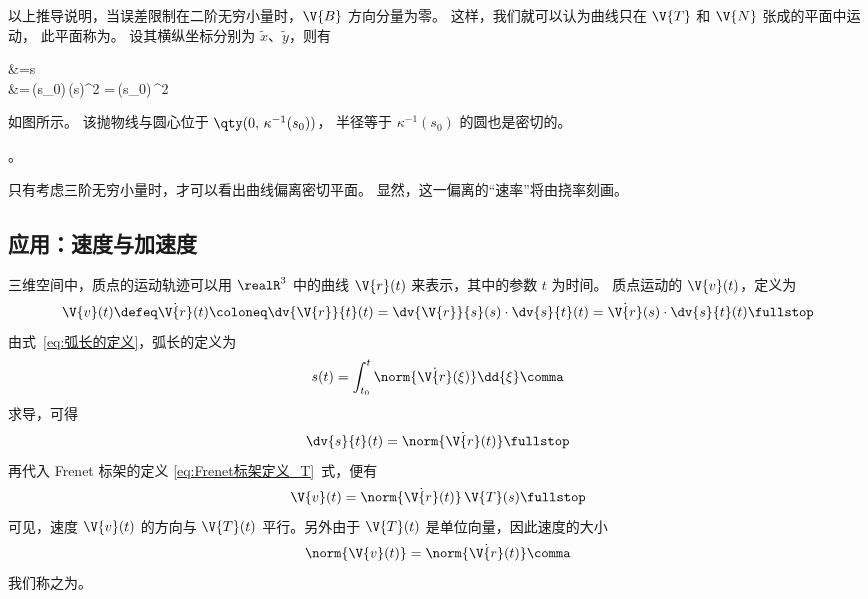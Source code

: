 以上推导说明，当误差限制在二阶无穷小量时，$\V{B}$ 方向分量为零。
这样，我们就可以认为曲线只在 $\V{T}$ 和 $\V{N}$ 张成的平面中运动，
此平面称为。
设其横纵坐标分别为 $\tilde{x}$、$\tilde{y}$，则有
\begin{braceEq}
	&=\incr s \comma \\
	&=\,\kappa(s_0)\,(\incr s)^2
		=\,\kappa(s_0)\,^2 \fullstop
\end{braceEq}
如图所示。
该抛物线与圆心位于 $\qty(0,\,\kappa^{-1}(s_0))$，
半径等于 $\kappa^{-1}(s_0)$ 的圆也是密切的。

。

只有考虑三阶无穷小量时，才可以看出曲线偏离密切平面。
显然，这一偏离的“速率”将由挠率刻画。

\subsection{应用：速度与加速度}
三维空间中，质点的运动轨迹可以用 $\realR^3$ 中的曲线
$\V{r}(t)$ 来表示，其中的参数 $t$ 为时间。
质点运动的 $\V{v}(t)$，定义为
\begin{equation}
	\V{v}(t)\defeq\dot{\V{r}}(t)
	\coloneq\dv{\V{r}}{t} (t)
	=\dv{\V{r}}{s} (s) \cdot \dv{s}{t} (t)
	=\dot{\V{r}}(s)\cdot\dv{s}{t} (t) \fullstop
\end{equation}
由式~\eqref{eq:弧长的定义}，弧长的定义为
\begin{equation}
	s(t)=\int_{t_0}^{t} \norm{\dot{\V{r}}(\xi)}\dd{\xi} \comma
\end{equation}
求导，可得
\begin{equation}
	\dv{s}{t} (t) = \norm{\dot{\V{r}}(t)} \fullstop
	\label{eq:弧长的导数}
\end{equation}
再代入 Frenet 标架的定义 \eqref{eq:Frenet标架定义_T}~式，便有
\begin{equation}
	\V{v}(t)=\norm{\dot{\V{r}}(t)}\,\V{T}(s) \fullstop
\end{equation}
可见，速度 $\V{v}(t)$ 的方向与 $\V{T}(t)$ 平行。另外由于 $\V{T}(t)$
是单位向量，因此速度的大小
\begin{equation}
	\norm{\V{v}(t)}=\norm{\dot{\V{r}}(t)} \comma
\end{equation}
我们称之为。

